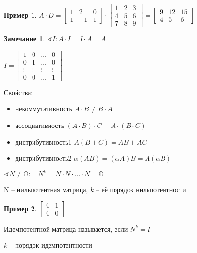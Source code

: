 \documentclass{book}
\theoremstyle{definition}
\newtheorem*{note}{Замечание}
\newtheorem*{example}{Пример}
\begin{document}
\begin{example}
    $A\cdot D = \begin{bmatrix} 1&2&0\\1&-1&1 \end{bmatrix} \cdot \begin{bmatrix} 1&2&3\\4&5&6\\7&8&9 \end{bmatrix}  = \begin{bmatrix} 9&12&15\\4&5&6 \end{bmatrix} $


\end{example}

    \begin{note}
        $\sphericalangle I: A\cdot I = I\cdot A = A$

        $I = \begin{bmatrix} 1&0&\ldots&0\\
        0&1&\ldots&0\\ 
        \vdots&\vdots&\vdots&\vdots\\
        0&0&\ldots&1 \end{bmatrix} $
    \end{note}

    Свойства:
    \begin{itemize}
        \item некоммутативность $A\cdot B \neq B\cdot A$
        \item ассоциативность $(A\cdot B)\cdot C = A\cdot (B\cdot C) $
        \item дистрибутивность1  $A(B+C) = AB + AC$
        \item дистрибутивноcть2 $\alpha (AB) = (\alpha A)B = A(\alpha B)$
    \end{itemize}
    \begin{definition}
        
    $\sphericalangle N\neq \mathbb{O}:\quad N^k = N\cdot N\cdot \ldots\cdot N = \mathbb{O}$

    N -- нильпотентная матрица, $k$ -- её порядок нильпотентности
    \end{definition}
    \begin{example}
        $\begin{bmatrix} 0& 1\\0&0\end{bmatrix} $
    \end{example}

    \begin{definition}
        Идемпотентной матрица называется, если $N^k = I$

        $k$ -- порядок идемпотентности

        
    \end{definition}
\end{document}
